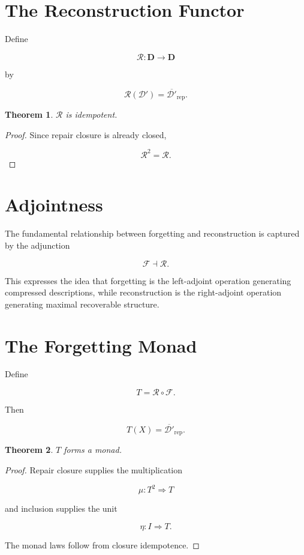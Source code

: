 \documentclass[12pt,oneside]{book}
\theoremstyle{plain} \newtheorem{theorem}{Theorem}[chapter] \newtheorem{lemma}[theorem]{Lemma} \newtheorem{proposition}[theorem]{Proposition} \newtheorem{corollary}[theorem]{Corollary}
\theoremstyle{definition} \newtheorem{definition}[theorem]{Definition} \newtheorem{axiom}[theorem]{Axiom} \newtheorem{construction}[theorem]{Construction}
\theoremstyle{remark} \newtheorem{remark}[theorem]{Remark} \newtheorem{example}[theorem]{Example}
\newcommand{\D}{\mathcal{D}} \newcommand{\R}{\mathcal{R}} \newcommand{\F}{\mathcal{F}} \newcommand{\U}{\mathcal{U}} \newcommand{\M}{\mathcal{M}} \newcommand{\G}{\Gamma}
\begin{document}
\section{The Reconstruction Functor}

Define

\[
\mathcal R:
\mathbf D
\rightarrow
\mathbf D
\]

by

\[
\mathcal R(\D')
=
\overline{\D'}_{\mathrm{rep}}.
\]

\begin{theorem}

$\mathcal R$ is idempotent.

\end{theorem}

\begin{proof}

Since repair closure is already closed,

\[
\mathcal R^2
=
\mathcal R.
\]

\end{proof}

\section{Adjointness}

The fundamental relationship between forgetting and reconstruction is captured by the adjunction

\[
\mathcal F
\dashv
\mathcal R.
\]

This expresses the idea that forgetting is the left-adjoint operation generating compressed descriptions, while reconstruction is the right-adjoint operation generating maximal recoverable structure.

\section{The Forgetting Monad}

Define

\[
T
=
\mathcal R
\circ
\mathcal F.
\]

Then

\[
T(X)
=
\overline{\D'}_{\mathrm{rep}}.
\]

\begin{theorem}

$T$ forms a monad.

\end{theorem}

\begin{proof}

Repair closure supplies the multiplication

\[
\mu:T^2\Rightarrow T
\]

and inclusion supplies the unit

\[
\eta:
I\Rightarrow T.
\]

The monad laws follow from closure idempotence.

\end{proof}
\end{document}
